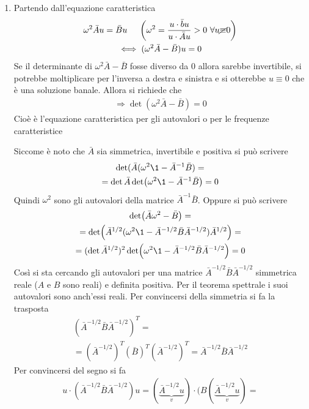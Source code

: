 \documentclass[Main.tex]{subfiles}
\begin{document}
\begin{dm}
\begin{enumerate}
	\item Partendo dall'equazione caratteristica
\begin{gather}
	\omega^2 \bar A u = \bar B u \ \ \ \ \left( \omega^2 = \frac{u \cdot \bar b u}{u \cdot \bar Au} > 0 \ \forall u \cancel \equiv 0 \right)\\
	\iff ( \omega^2 \bar A - \bar B ) u =0 
\end{gather}	
Se il determinante di $\omega^2 \bar A - \bar B $ fosse diverso da 0 allora sarebbe invertibile, si potrebbe moltiplicare per l'inversa a destra e sinistra e si otterebbe $u \equiv 0$ che è una soluzione banale. Allora si richiede che 
\begin{gather}
	\Rightarrow \det ( \omega^2 \bar A - \bar B )=0
\end{gather}
Cioè è l'equazione caratteristica per gli autovalori o per le frequenze caratteristice
\begin{osservazione}
	Siccome è noto che $\bar A$ sia simmetrica, invertibile e positiva si può scrivere
	\begin{gather}
		\text{det} ( \bar A ( \omega^2 \1 - \bar A ^{-1} \bar B ) = \\ = \det \bar A \det (\omega^2 \1 - \bar A^{-1} \bar B ) =0
	\end{gather}
	Quindi $\omega^2$ sono gli autovalori della matrice $\bar A^{-1} \bar B$. Oppure si può scrivere
	\begin{gather*}
		\det ( \bar A \omega^2 - \bar B ) =\\ = \det ( \bar A^{1/2} ( \omega^2 \1 - \bar A^{-1/2} \bar B \bar A^{-1/2} ) \bar A ^{1/2} )=\\
		= (\det \bar A^{1/2} )^2 \det  ( \omega^2 \1 - \bar A^{-1/2} \bar B \bar A^{-1/2} )=0
	\end{gather*}
	Così si sta cercando gli autovalori per una matrice $\bar A^{-1/2} \bar B \bar A^{-1/2} $ simmetrica reale ($A$ e $B$ sono reali) e definita positiva. Per il teorema spettrale i suoi autovalori sono anch'essi reali. Per convincersi della simmetria si fa la trasposta
	\begin{gather}
		( \bar A^{-1/2} \bar B \bar A^{-1/2} )^T =\\= (\bar A^{-1/2})^T( \bar B)^T ( \bar A^{-1/2})^T  = \bar A^{-1/2} \bar B \bar A^{-1/2} 
	\end{gather}
	Per convincersi del segno si fa
	\begin{gather*}
		u \cdot ( \bar A^{-1/2} \bar B \bar A^{-1/2} )u = ( \underbrace{\bar A^{-1/2} u}_{v}) \cdot (B ( \underbrace{\bar A^{-1/2} u}_{v}) = \\

\end{gather*}
\end{osservazione}
\end{enumerate}
\end{dm}
\end{document}
